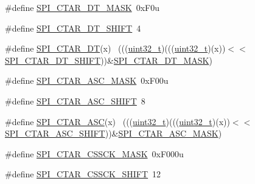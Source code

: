 \begin{DoxyCompactItemize}
\item 
\#define \hyperlink{group___s_p_i___register___masks_ga7d4ee19c78f67b68c6320eefe6a53ac0}{S\+P\+I\+\_\+\+C\+T\+A\+R\+\_\+\+D\+T\+\_\+\+M\+A\+SK}~0x\+F0u
\item 
\#define \hyperlink{group___s_p_i___register___masks_gaac557ee81ac4ec00ee6280d5b761edf1}{S\+P\+I\+\_\+\+C\+T\+A\+R\+\_\+\+D\+T\+\_\+\+S\+H\+I\+FT}~4
\item 
\#define \hyperlink{group___s_p_i___register___masks_ga82a46889f3771fab6dca2dc28eac5100}{S\+P\+I\+\_\+\+C\+T\+A\+R\+\_\+\+DT}(x)                                                  ~(((\hyperlink{_p_e___types_8h_a33594304e786b158f3fb30289278f5af}{uint32\+\_\+t})(((\hyperlink{_p_e___types_8h_a33594304e786b158f3fb30289278f5af}{uint32\+\_\+t})(x))$<$$<$\hyperlink{group___s_p_i___register___masks_gaac557ee81ac4ec00ee6280d5b761edf1}{S\+P\+I\+\_\+\+C\+T\+A\+R\+\_\+\+D\+T\+\_\+\+S\+H\+I\+FT}))\&\hyperlink{group___s_p_i___register___masks_ga7d4ee19c78f67b68c6320eefe6a53ac0}{S\+P\+I\+\_\+\+C\+T\+A\+R\+\_\+\+D\+T\+\_\+\+M\+A\+SK})
\item 
\#define \hyperlink{group___s_p_i___register___masks_gad15c92f5474cc1ba1ca2af14c92cbf26}{S\+P\+I\+\_\+\+C\+T\+A\+R\+\_\+\+A\+S\+C\+\_\+\+M\+A\+SK}~0x\+F00u
\item 
\#define \hyperlink{group___s_p_i___register___masks_gadbf91ef3bf1d4943ab782ff027d121bd}{S\+P\+I\+\_\+\+C\+T\+A\+R\+\_\+\+A\+S\+C\+\_\+\+S\+H\+I\+FT}~8
\item 
\#define \hyperlink{group___s_p_i___register___masks_ga6d9f16d5f0d5a66e6c217d43dea5953f}{S\+P\+I\+\_\+\+C\+T\+A\+R\+\_\+\+A\+SC}(x)                                                ~(((\hyperlink{_p_e___types_8h_a33594304e786b158f3fb30289278f5af}{uint32\+\_\+t})(((\hyperlink{_p_e___types_8h_a33594304e786b158f3fb30289278f5af}{uint32\+\_\+t})(x))$<$$<$\hyperlink{group___s_p_i___register___masks_gadbf91ef3bf1d4943ab782ff027d121bd}{S\+P\+I\+\_\+\+C\+T\+A\+R\+\_\+\+A\+S\+C\+\_\+\+S\+H\+I\+FT}))\&\hyperlink{group___s_p_i___register___masks_gad15c92f5474cc1ba1ca2af14c92cbf26}{S\+P\+I\+\_\+\+C\+T\+A\+R\+\_\+\+A\+S\+C\+\_\+\+M\+A\+SK})
\item 
\#define \hyperlink{group___s_p_i___register___masks_ga5c824276fa48ae7b05fc922d20d237c0}{S\+P\+I\+\_\+\+C\+T\+A\+R\+\_\+\+C\+S\+S\+C\+K\+\_\+\+M\+A\+SK}~0x\+F000u
\item 
\#define \hyperlink{group___s_p_i___register___masks_gaf4e35373d2e9149e1c73f9b65887ad37}{S\+P\+I\+\_\+\+C\+T\+A\+R\+\_\+\+C\+S\+S\+C\+K\+\_\+\+S\+H\+I\+FT}~12
\item 

\end{DoxyCompactItemize}

